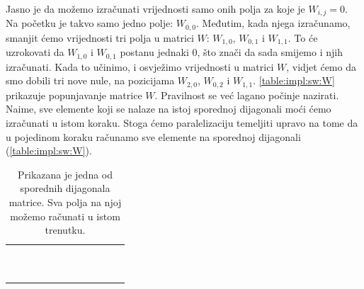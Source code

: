 \documentclass[times, utf8, zavrsni]{fer}
\begin{document}
Jasno je da možemo izračunati vrijednosti samo onih polja
za koje je $W_{i,j}=0$. Na početku je takvo samo jedno polje:
$W_{0,0}$. Međutim, kada njega izračunamo, smanjit ćemo
vrijednosti tri polja u matrici $W$: $W_{1,0}$, $W_{0,1}$ i
$W_{1,1}$. To će uzrokovati da $W_{1,0}$ i $W_{0,1}$ postanu
jednaki $0$, što znači da sada smijemo i njih izračunati.
Kada to učinimo, i osvježimo vrijednosti u matrici $W$, 
vidjet ćemo da smo dobili tri nove nule, na pozicijama
$W_{2,0}$, $W_{0,2}$ i $W_{1,1}$. \autoref{table:impl:sw:W}
prikazuje popunjavanje matrice $W$. Pravilnost se već
lagano počinje nazirati. Naime, sve elemente koji 
se nalaze na istoj sporednoj dijagonali moći ćemo 
izračunati u istom koraku. Stoga ćemo paralelizaciju
temeljiti upravo na tome da u pojedinom koraku
računamo sve elemente na sporednoj dijagonali (\autoref{table:impl:sw:W}).

\begin{table}
\centering
\begin{tabularx}{240pt}{|R|R|R|R|R|R|R|R|R|R|R|R|}
 \hline
  &  &  &  &  &  &  &  &  &   &  &  \\ \hline
  &  &  &  &  &  &  &  &   &  &  &  \\ \hline
  &  &  &  &  &  &  &   &  &  &  &  \\ \hline
  &  &  &  &  &  &   &  &  &  &  &  \\ \hline
  &  &  &  &  &   &  &  &  &  &  &  \\ \hline
  &  &  &  &   &  &  &  &  &  &  &  \\ \hline
  &  &  &   &  &  &  &  &  &  &  &  \\ \hline
  &  &   &  &  &  &  &  &  &  &  &  \\ \hline
  &   &  &  &  &  &  &  &  &  &  &  \\ \hline
   &  &  &  &  &  &  &  &  &  &  &  \\ \hline
  &  &  &  &  &  &  &  &  &  &  &  \\ \hline
\end{tabularx}
\caption[Prikaz sporedne dijagonale]{Prikazana je jedna od sporednih
dijagonala matrice. Sva polja na njoj možemo računati u istom trenutku.}
\label{table:impl:dijagonala}
\end{table}
\end{document}
